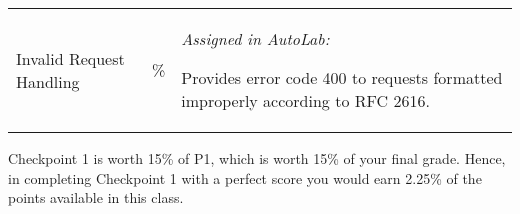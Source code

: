 \begin{center}
\begin{tabular}{>{\centering\arraybackslash}m{1in}>{\centering\arraybackslash}m{1in}p{3in}}
  \hline
  \addlinespace[5pt]

  Invalid Request Handling&45\%&\vspace{-10pt} 
                              {\it Assigned in AutoLab:}
                              \begin{packed_itemize}
\item Provides error code 400 to requests formatted improperly according to RFC 2616.
                              \end{packed_itemize}\\

\end{tabular}
\end{center}


\noindent Checkpoint 1 is worth 15\% of P1, which is worth 15\% of your final grade. Hence, in completing Checkpoint 1 with a perfect score you would earn 2.25\% of the points available in this class.

